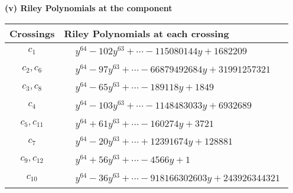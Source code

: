 \documentclass[1p]{elsarticle_modified}
\theoremstyle{definition}
\begin{document}
\newpage\renewcommand{\arraystretch}{1}
\flushleft \textbf{(v) Riley Polynomials at the component}\newline \\
\begin{tabular}{m{50pt}|m{274pt}}
Crossings & \hspace{64pt}Riley Polynomials at each crossing \\
\hline $$\begin{aligned}c_{1}\end{aligned}$$&$\begin{aligned}
&y^{64}-102 y^{63}+\cdots-115080144 y+1682209
\end{aligned}$\\
\hline $$\begin{aligned}c_{2},c_{6}\end{aligned}$$&$\begin{aligned}
&y^{64}-97 y^{63}+\cdots-66879492684 y+31991257321
\end{aligned}$\\
\hline $$\begin{aligned}c_{3},c_{8}\end{aligned}$$&$\begin{aligned}
&y^{64}-65 y^{63}+\cdots-189118 y+1849
\end{aligned}$\\
\hline $$\begin{aligned}c_{4}\end{aligned}$$&$\begin{aligned}
&y^{64}-103 y^{63}+\cdots-1148483033 y+6932689
\end{aligned}$\\
\hline $$\begin{aligned}c_{5},c_{11}\end{aligned}$$&$\begin{aligned}
&y^{64}+61 y^{63}+\cdots-160274 y+3721
\end{aligned}$\\
\hline $$\begin{aligned}c_{7}\end{aligned}$$&$\begin{aligned}
&y^{64}-20 y^{63}+\cdots+12391674 y+128881
\end{aligned}$\\
\hline $$\begin{aligned}c_{9},c_{12}\end{aligned}$$&$\begin{aligned}
&y^{64}+56 y^{63}+\cdots-4566 y+1
\end{aligned}$\\
\hline $$\begin{aligned}c_{10}\end{aligned}$$&$\begin{aligned}
&y^{64}-36 y^{63}+\cdots-918166302603 y+243926344321
\end{aligned}$\\
\hline
\end{tabular}\\~\\
\end{document}

